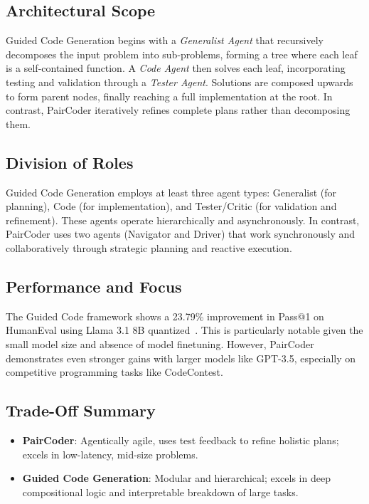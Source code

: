 \documentclass[11pt,a4paper]{article}
\begin{document}
\subsection{Architectural Scope}
Guided Code Generation begins with a \textit{Generalist Agent} that recursively decomposes the input problem into sub-problems, forming a tree where each leaf is a self-contained function. A \textit{Code Agent} then solves each leaf, incorporating testing and validation through a \textit{Tester Agent}. Solutions are composed upwards to form parent nodes, finally reaching a full implementation at the root. In contrast, PairCoder iteratively refines complete plans rather than decomposing them.

\subsection{Division of Roles}
Guided Code Generation employs at least three agent types: Generalist (for planning), Code (for implementation), and Tester/Critic (for validation and refinement). These agents operate hierarchically and asynchronously. In contrast, PairCoder uses two agents (Navigator and Driver) that work synchronously and collaboratively through strategic planning and reactive execution.

\subsection{Performance and Focus}
The Guided Code framework shows a 23.79\% improvement in Pass@1 on HumanEval using Llama 3.1 8B quantized~\cite{almorsi2025guided}. This is particularly notable given the small model size and absence of model finetuning. However, PairCoder demonstrates even stronger gains with larger models like GPT-3.5, especially on competitive programming tasks like CodeContest.

\subsection{Trade-Off Summary}
\begin{itemize}
\item \textbf{PairCoder}: Agentically agile, uses test feedback to refine holistic plans; excels in low-latency, mid-size problems.
\item \textbf{Guided Code Generation}: Modular and hierarchical; excels in deep compositional logic and interpretable breakdown of large tasks.
\end{itemize}
\end{document}
